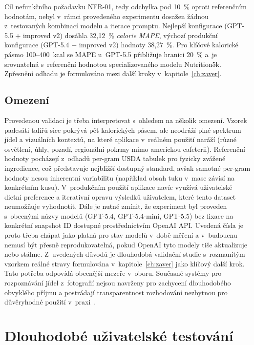 Cíl nefunkčního požadavku NFR-01, tedy odchylka pod 10~\% oproti referenčním hodnotám, nebyl v~rámci provedeného experimentu dosažen žádnou z~testovaných kombinací modelu a iterace promptu.
Nejlepší konfigurace (GPT-5.5 + improved v2) dosáhla 32,12~\% \emph{calorie MAPE}, výchozí produkční konfigurace (GPT-5.4 + improved v2) hodnoty 38,27~\%.
Pro klíčové kalorické pásmo 100--400~kcal se MAPE u~GPT-5.5 přibližuje hranici 20~\% a~je srovnatelná s~referenční hodnotou specializovaného modelu Nutrition5k.
Zpřesnění odhadu je formulováno mezi další kroky v~kapitole~\ref{ch:zaver}.

\subsection{Omezení}
\label{subsec:benchmarkOmezeni}
Provedenou validaci je třeba interpretovat s~ohledem na několik omezení.
Vzorek padesáti talířů sice pokrývá pět kalorických pásem, ale neodráží plné spektrum jídel a vizuálních kontextů, na které aplikace v~reálném použití naráží (různé osvětlení, úhly, pozadí, regionální pokrmy mimo americkou cafeterii).
Referenční hodnoty pocházejí z~odhadů per-gram USDA tabulek pro fyzicky zvážené ingredience, což představuje nejbližší dostupný standard, avšak samotné per-gram hodnoty nesou inherentní variabilitu (například obsah tuku v~mase závisí na konkrétním kusu).
V~produkčním použití aplikace navíc využívá uživatelské dietní preference a iterativní opravu výsledků uživatelem, které tento dataset neumožňuje vyhodnotit.
Dále je nutné zmínit, že experiment byl proveden s~obecnými názvy modelů (GPT-5.4, GPT-5.4-mini, GPT-5.5) bez fixace na konkrétní snapshot ID dostupné prostřednictvím OpenAI API.
Uvedená čísla je proto třeba chápat jako platná pro stav modelů v~době měření a v~budoucnu nemusí být přesně reprodukovatelná, pokud OpenAI tyto modely tiše aktualizuje nebo stáhne.
Z~uvedených důvodů je dlouhodobá validační studie s~rozmanitým vzorkem reálné stravy formulována v~kapitole~\ref{ch:zaver} jako klíčový další krok.
Tato potřeba odpovídá obecnější mezeře v~oboru. Současné systémy pro rozpoznávání jídel z~fotografií nejsou navrženy pro zachycení dlouhodobého obvyklého příjmu a postrádají transparentnost rozhodování nezbytnou pro důvěryhodné použití v~praxi~\cite{chotwanvirat2024scoping}.

\section{Dlouhodobé uživatelské testování}
\label{sec:dlouhodobeTestovani}

